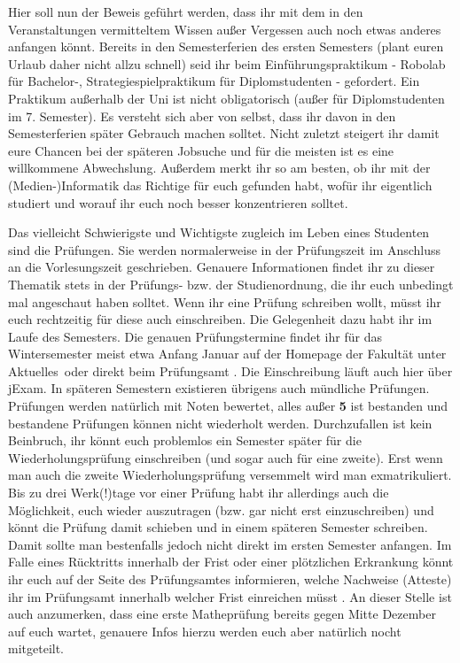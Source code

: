 
Hier soll nun der Beweis geführt werden, dass ihr mit dem in den Veranstaltungen vermitteltem Wissen außer Vergessen auch noch etwas anderes anfangen könnt.
Bereits in den Semesterferien des ersten Semesters (plant euren Urlaub daher nicht allzu schnell) seid ihr beim Einführungspraktikum - Robolab für Bachelor-, Strategiespielpraktikum für Diplomstudenten - gefordert.
Ein Praktikum außerhalb der Uni ist nicht obligatorisch (außer für Diplomstudenten im 7. Semester).
Es versteht sich aber von selbst, dass ihr davon in den Semesterferien später Gebrauch machen solltet.
Nicht zuletzt steigert ihr damit eure Chancen bei der späteren Jobsuche und für die meisten ist es eine willkommene Abwechslung.
Außerdem merkt ihr so am besten, ob ihr mit der (Medien-)Informatik das Richtige für euch gefunden habt, wofür ihr eigentlich studiert und worauf ihr euch noch besser konzentrieren solltet.


Das vielleicht Schwierigste und Wichtigste zugleich im Leben eines Studenten sind die Prüfungen.
Sie werden normalerweise in der Prüfungszeit im Anschluss an die Vorlesungszeit geschrieben.
Genauere Informationen findet ihr zu dieser Thematik stets in der Prüfungs- bzw. der Studienordnung, die ihr euch unbedingt mal angeschaut haben solltet.
Wenn ihr eine Prüfung schreiben wollt, müsst ihr euch rechtzeitig für diese auch einschreiben.
Die Gelegenheit dazu habt ihr im Laufe des Semesters.
Die genauen Prüfungstermine findet ihr für das Wintersemester meist etwa Anfang Januar auf der Homepage der Fakultät \link{\textcolor{red}{NONE}} unter \glqq Aktuelles\grqq\ oder direkt beim Prüfungsamt \link{\textcolor{red}{NONE}}.
Die Einschreibung läuft auch hier über jExam.
In späteren Semestern existieren übrigens auch mündliche Prüfungen.
Prüfungen werden natürlich mit Noten bewertet, alles außer \textbf{5} ist bestanden und bestandene Prüfungen können nicht wiederholt werden.
Durchzufallen ist kein Beinbruch, ihr könnt euch problemlos ein Semester später für die Wiederholungsprüfung einschreiben (und sogar auch für eine zweite).
Erst wenn man auch die zweite Wiederholungsprüfung versemmelt wird man exmatrikuliert.
Bis zu drei Werk(!)tage vor einer Prüfung habt ihr allerdings auch die Möglichkeit, euch wieder auszutragen (bzw. gar nicht erst einzuschreiben) und könnt die Prüfung damit schieben und in einem späteren Semester schreiben.
Damit sollte man bestenfalls jedoch nicht direkt im ersten Semester anfangen.
Im Falle eines Rücktritts innerhalb der Frist oder einer plötzlichen Erkrankung könnt ihr euch auf der Seite des Prüfungsamtes informieren, welche Nachweise (Atteste) ihr im Prüfungsamt innerhalb welcher Frist einreichen müsst \link{\textcolor{red}{NONE}}.
An dieser Stelle ist auch anzumerken, dass eine erste Matheprüfung bereits gegen Mitte Dezember auf euch wartet, genauere Infos hierzu werden euch aber natürlich nocht mitgeteilt.

